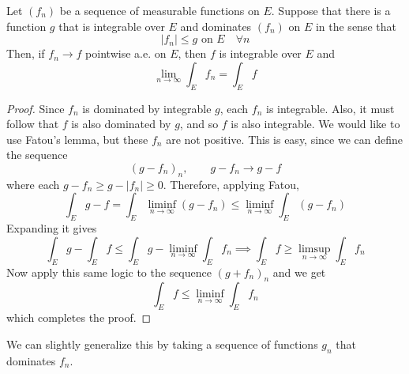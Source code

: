   \begin{theorem}
    
  \end{theorem}

  \begin{theorem}
    Let $(f_n)$ be a sequence of measurable functions on $E$. Suppose that there is a function $g$ that is integrable over $E$ and dominates $(f_n)$ on $E$ in the sense that 
    \begin{equation}
      |f_n| \leq g \text{ on } E \quad \forall n
    \end{equation}
    Then, if $f_n \to f$ pointwise a.e. on $E$, then $f$ is integrable over $E$ and 
    \begin{equation}
      \lim_{n \to \infty} \int_E f_n = \int_E f
    \end{equation}
  \end{theorem}
  \begin{proof}
    Since $f_n$ is dominated by integrable $g$, each $f_n$ is integrable. Also, it must follow that $f$ is also dominated by $g$, and so $f$ is also integrable. We would like to use Fatou's lemma, but these $f_n$ are not positive. This is easy, since we can define the sequence
    \begin{equation}
      (g - f_n)_n, \qquad g - f_n \to g - f 
    \end{equation}
    where each $g - f_n \geq g - |f_n| \geq 0$. Therefore, applying Fatou, 
    \begin{equation}
      \int_E g - f = \int_E \liminf_{n \to \infty} (g - f_n) \leq \liminf_{n \to \infty} \int_E (g - f_n)
    \end{equation}
    Expanding it gives 
    \begin{equation}
      \int_E g - \int_E f \leq \int_E g - \liminf_{n \to \infty} \int_E f_n \implies \int_E f \geq \limsup_{n \to \infty} \int_E f_n
    \end{equation}
    Now apply this same logic to the sequence $(g + f_n)_n$ and we get 
    \begin{equation}
      \int_E f \leq \liminf_{n \to \infty} \int_E f_n
    \end{equation}
    which completes the proof. 
  \end{proof}

  We can slightly generalize this by taking a sequence of functions $g_n$ that dominates $f_n$. 

